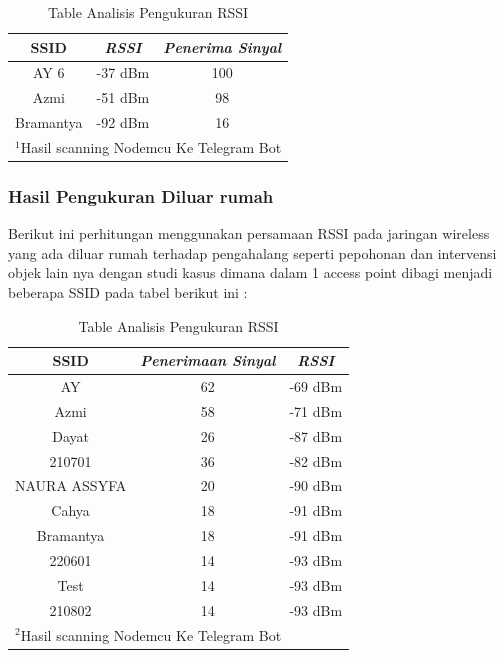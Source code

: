 \documentclass[conference]{IEEEtran}
\begin{document}
    \begin{table}[htbp]
        \caption{Table Analisis Pengukuran RSSI}
        \begin{center}
        \begin{tabular}{|c|c|c|}
            \hline
        \textbf{SSID}&\textbf{\textit{RSSI}}& \textbf{\textit{Penerima Sinyal}} \\
        \hline
        AY 6 & -37 dBm & 100  \\
        \hline
        Azmi & -51 dBm & 98  \\
        \hline
        Bramantya & -92 dBm & 16   \\
        \hline
        \multicolumn{3}{l}{$^{\mathrm{1}}$Hasil scanning Nodemcu Ke Telegram Bot}
        \end{tabular}
        \label{tab1}
        \end{center}
        \end{table}

        \subsubsection{Hasil Pengukuran Diluar rumah}
        Berikut ini perhitungan menggunakan persamaan RSSI 
    pada jaringan wireless yang ada diluar rumah
     terhadap pengahalang seperti pepohonan dan intervensi objek lain nya dengan studi kasus dimana dalam 1 access
     point dibagi menjadi beberapa SSID pada tabel berikut ini : 
    
     \begin{table}[htbp]
        \caption{Table Analisis Pengukuran RSSI}
        \begin{center}
        \begin{tabular}{|c|c|c|}
            \hline
        \textbf{SSID} &  \textbf{\textit{Penerimaan Sinyal}}& \textbf{\textit{RSSI}} \\
        \hline
        AY  & 62 & -69 dBm   \\
        \hline
        Azmi & 58 & -71 dBm   \\
        \hline
        Dayat & 26 & -87 dBm   \\
        \hline
        210701  & 36 & -82 dBm   \\
        \hline
        NAURA ASSYFA  & 20 & -90 dBm   \\
        \hline
        Cahya & 18 & -91 dBm   \\
        \hline
        Bramantya  & 18 & -91 dBm   \\
        \hline
        220601  & 14 & -93 dBm   \\
        \hline
        Test  & 14 & -93 dBm   \\
        \hline
        210802  & 14 & -93 dBm   \\
        \hline
    
        \multicolumn{3}{l}{$^{\mathrm{2}}$Hasil scanning Nodemcu Ke Telegram Bot}
        \end{tabular}
        \label{tab2}
        \end{center}
        \end{table}
    
\end{document}
